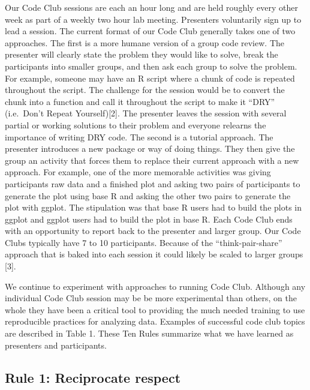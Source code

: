 \documentclass[
  11pt,
]{article}
\begin{document}
Our Code Club sessions are each an hour long and are held roughly every
other week as part of a weekly two hour lab meeting. Presenters
voluntarily sign up to lead a session. The current format of our Code
Club generally takes one of two approaches. The first is a more humane
version of a group code review. The presenter will clearly state the
problem they would like to solve, break the participants into smaller
groups, and then ask each group to solve the problem. For example,
someone may have an R script where a chunk of code is repeated
throughout the script. The challenge for the session would be to convert
the chunk into a function and call it throughout the script to make it
``DRY'' (i.e.~Don't Repeat Yourself){[}2{]}. The presenter leaves the
session with several partial or working solutions to their problem and
everyone relearns the importance of writing DRY code. The second is a
tutorial approach. The presenter introduces a new package or way of
doing things. They then give the group an activity that forces them to
replace their current approach with a new approach. For example, one of
the more memorable activities was giving participants raw data and a
finished plot and asking two pairs of participants to generate the plot
using base R and asking the other two pairs to generate the plot with
ggplot. The stipulation was that base R users had to build the plots in
ggplot and ggplot users had to build the plot in base R. Each Code Club
ends with an opportunity to report back to the presenter and larger
group. Our Code Clubs typically have 7 to 10 participants. Because of
the ``think-pair-share'' approach that is baked into each session it
could likely be scaled to larger groups {[}3{]}.

We continue to experiment with approaches to running Code Club. Although
any individual Code Club session may be be more experimental than
others, on the whole they have been a critical tool to providing the
much needed training to use reproducible practices for analyzing data.
Examples of successful code club topics are described in Table 1. These
Ten Rules summarize what we have learned as presenters and participants.

\hypertarget{rule-1-reciprocate-respect}{%
\subsection{Rule 1: Reciprocate
respect}\label{rule-1-reciprocate-respect}}
\end{document}
